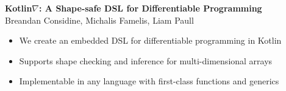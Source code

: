 \documentclass[portrait,a0b,final,a4resizeable]{a0poster}
\def\jointspacing{\vspace{0.3in}}
\begin{document}
  \begin{poster}
    \vspace{1\baselineskip}   %


    \begin{center}
      \begin{pcolumn}{1.03}
        \begin{minipage}[c][9cm][c]{0.85\textwidth}
          \begin{center}
          {\veryHuge \textbf{Kotlin$\nabla$: A Shape-safe DSL for Differentiable Programming}}\\[10mm]
          {\huge Breandan Considine, Michalis Famelis, Liam Paull\\[7.5mm]
          }
          \end{center}
        \end{minipage}
      \end{pcolumn}
    \end{center}

    \vspace*{1.5cm}

    \large



    \Large

    \begin{multicols}{2}



      \vspace*{-1cm}
      \null\hspace*{3cm}\begin{minipage}[c]{0.85\columnwidth}
                          \begin{itemize}
                            \item We create an embedded DSL for differentiable programming in Kotlin
                            \item Supports shape checking and inference for multi-dimensional arrays
                            \item Implementable in any language with first-class functions and generics
                          \end{itemize}
      \end{minipage}

      \jointspacing


\end{multicols}
\end{poster}
\end{document}

